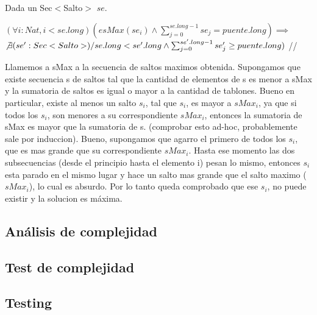 Dada un Sec$<$Salto$>$ $se$.

$(\forall i:Nat, i < se.long)(esMax(se_{i}) \wedge \sum_{j=0}^{se.long-1}se_{j} = puente.long)\implies$ \\ $\not\exists (se':Sec<Salto>) /
se.long < se'.long \wedge \sum_{j=0}^{se'.long-1}se'_{j} \geq puente.long)$  //

Llamemos a sMax a la secuencia de saltos maximos obtenida.
Supongamos que existe secuencia s de saltos tal que la cantidad de elementos de s es menor a sMax y la sumatoria de saltos es igual o mayor a la cantidad de tablones.
Bueno en particular, existe al menos un salto $s_{i}$, tal que $s_{i}$, es mayor a $sMax_{i}$,  ya que si todos los $s_{i}$, son menores a su correspondiente $sMax_{i}$,
entonces la sumatoria de sMax es mayor que la sumatoria de s. (comprobar esto ad-hoc, probablemente sale por induccion).
Bueno, supongamos que agarro el primero de todos los $s_{i}$, que es mas grande que su correspondiente $sMax_{i}$.
Hasta ese momento las dos subsecuencias (desde el principio hasta el elemento i) pesan lo mismo, entonces $s_{i}$ esta parado en el mismo lugar y hace un salto mas grande que el salto maximo ($sMax_{i}$), lo cual es absurdo.
Por lo tanto queda comprobado que ese $s_{i}$, no puede existir y la solucion es m\'axima.

\subsection{An\'alisis de complejidad}

\subsection{Test de complejidad}

\subsection{Testing}
